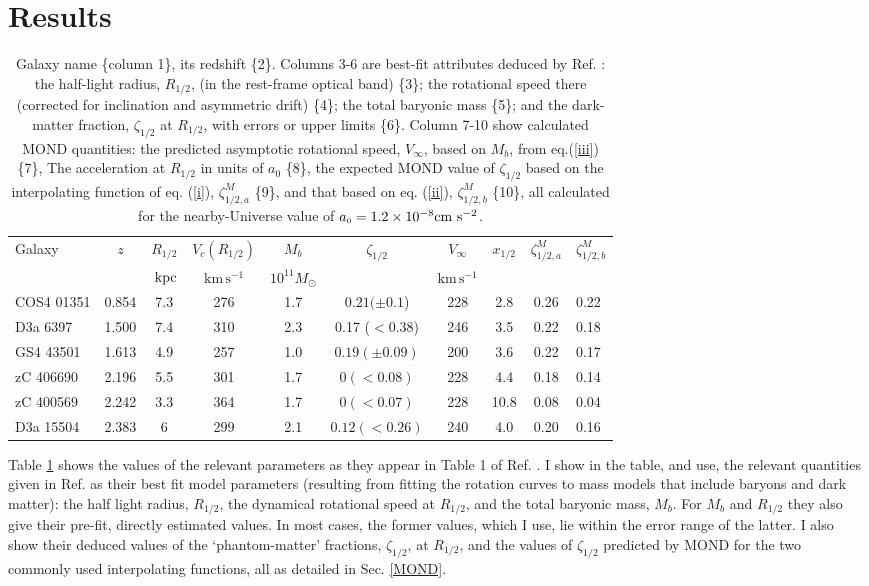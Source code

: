 \documentclass[twocolumn,showpacs,amsmath,amssymb,prd,nofootinbib]
{revtex4}
\def\sss{\scriptscriptstyle}
\def\^#1{^{\sss #1}}
\def\_#1{_{\sss #1}}
\def\cmss{{\rm cm~s^{-2}}}
\def\kpc{{\rm ~kpc}}
\def\msun{M\_{\odot}}
\def\az{a\_{0}}
\def\vinf{V_{\infty}}
\def\zef{\zeta\_{1/2}}
\def\raf{R\_{1/2}}
\newcommand{\kms}{\ensuremath{\mathrm{km}\,\mathrm{s}^{-1}}}
\begin{document}
\section{Results}
\begin{table}[t]
 \begin{tabular}{lccccccccl}
 \hline\hline


Galaxy& $z$ & $\raf$ & $V_c(\raf)$ & $M_b$& $\zef$& $\vinf$ & $x\_{1/2}$& $\zeta\^M\_{1/2,a}$ & $\zeta\^M\_{1/2,b}$  \\
& & $\kpc$ & $\kms$ & $10^{11}\msun$ & & $\kms$&&&\\
\hline
COS4 01351   &  0.854 & 7.3  & 276 & 1.7 & $0.21 (\pm0.1$) & 228 & 2.8 &0.26& 0.22 \\
D3a 6397 & 1.500&  7.4      & 310 & 2.3  & 0.17 ($<$0.38)	& 246 & 3.5 &0.22& 0.18 \\
GS4 43501  & 1.613 &  4.9  & 257 & 1.0 & $0.19 (\pm0.09)$ & 200 & 3.6 & 0.22 & 0.17 \\
zC 406690 &2.196	&  5.5   & 301  &  1.7  & $0 (<0.08)$ & 228 & 4.4 & 0.18 & 0.14 \\
zC 400569 & 2.242  &  3.3      & 364    	 & 1.7 & $0 (<0.07)$ & 228 & 10.8 & 0.08 & 0.04 \\
D3a 15504 & 2.383  &  6      & 299    	 & 2.1 & $0.12 (<0.26)$ & 240 & 4.0 & 0.20& 0.16\\
\hline
\end{tabular}
\caption{Galaxy name \{column 1\}, its redshift \{2\}. Columns 3-6 are best-fit attributes deduced by Ref. \cite{genzel17}: the half-light radius, $\raf$, (in the rest-frame optical band) \{3\}; the rotational speed there (corrected for inclination and asymmetric drift) \{4\}; the total baryonic mass \{5\}; and the dark-matter fraction, $\zef$ at $\raf$, with errors or upper limits \{6\}. Column 7-10 show calculated MOND quantities: the predicted asymptotic rotational speed, $\vinf$, based on $M_b$, from eq.(\ref{iii}) \{7\}, The acceleration at $\raf$ in units of $\az$ \{8\}, the expected MOND value of $\zef$ based on the interpolating function of eq. (\ref{i}), $\zeta\^M\_{1/2,a}$ \{9\}, and that based on eq. (\ref{ii}), $\zeta\^M\_{1/2,b}$ \{10\}, all calculated for the nearby-Universe value of $\az=1.2\times 10^{-8}\cmss$.}
\label{table}
\end{table}
\label{results}
Table \ref{table} shows the values of the relevant parameters as they appear in Table 1 of Ref. \cite{genzel17}. I show in the table, and use, the relevant quantities given in Ref. \cite{genzel17} as their best fit model parameters (resulting from fitting the rotation curves to mass models that include baryons and dark matter): the half light radius, $\raf$, the dynamical rotational speed at $\raf$, and the total baryonic mass, $M_b$. For $M_b$ and $\raf$ they also give their pre-fit, directly estimated values. In most cases, the former values, which I use, lie within the error range of the latter. I also show their deduced values of the `phantom-matter' fractions, $\zef$, at $\raf$, and the values of $\zef$ predicted by MOND for the two commonly used interpolating functions, all as detailed in Sec. \ref{MOND}.
\end{document}
